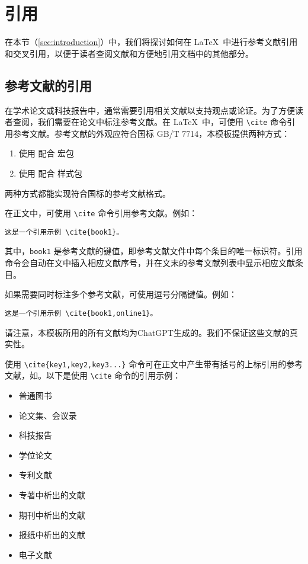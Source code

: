\section{引用}\label{sec:reference}

在本节（{\cref{sec:introduction}}）中，我们将探讨如何在 \LaTeX\ 中进行参考文献引用和交叉引用，以便于读者查阅文献和方便地引用文档中的其他部分。

\subsection{参考文献的引用}

在学术论文或科技报告中，通常需要引用相关文献以支持观点或论证。为了方便读者查阅，我们需要在论文中标注参考文献。在 \LaTeX\ 中，可使用 \verb|\cite| 命令引用参考文献。参考文献的外观应符合国标 GB/T 7714，本模板提供两种方式：
\begin{enumerate}
    \item 使用 \BibTeX{} 配合  宏包
    \item 使用 \BibLaTeX{} 配合  样式包
\end{enumerate}
两种方式都能实现符合国标的参考文献格式。

在正文中，可使用 \verb|\cite| 命令引用参考文献。例如：

\begin{Verbatim}
这是一个引用示例 \cite{book1}。
\end{Verbatim}

其中，\verb|book1| 是参考文献的键值，即参考文献文件中每个条目的唯一标识符。引用命令会自动在文中插入相应文献序号，并在文末的参考文献列表中显示相应文献条目。

如果需要同时标注多个参考文献，可使用逗号分隔键值。例如：

\begin{Verbatim}
这是一个引用示例 \cite{book1,online1}。
\end{Verbatim}

请注意，本模板所用的所有文献均为ChatGPT生成的。我们不保证这些文献的真实性。

使用 \verb|\cite{key1,key2,key3...}| 命令可在正文中产生带有括号的上标引用的参考文献，如\cite{book1,online1,article1}。以下是使用 \verb|\cite| 命令的引用示例：
\begin{itemize}
  \item 普通图书\cite{book1,book2}
  \item 论文集、会议录\cite{conf1,conf2}
  \item 科技报告\cite{techreport1,techreport2}
  \item 学位论文\cite{thesis1,thesis2,thesis3}
  \item 专利文献\cite{patent1,patent2}
  \item 专著中析出的文献\cite{inbook1,inbook2}
  \item 期刊中析出的文献\cite{qin2021,article1,article2}
  \item 报纸中析出的文献\cite{newspaper1,newspaper2}
  \item 电子文献\cite{online1,online2,online3}
\end{itemize}

